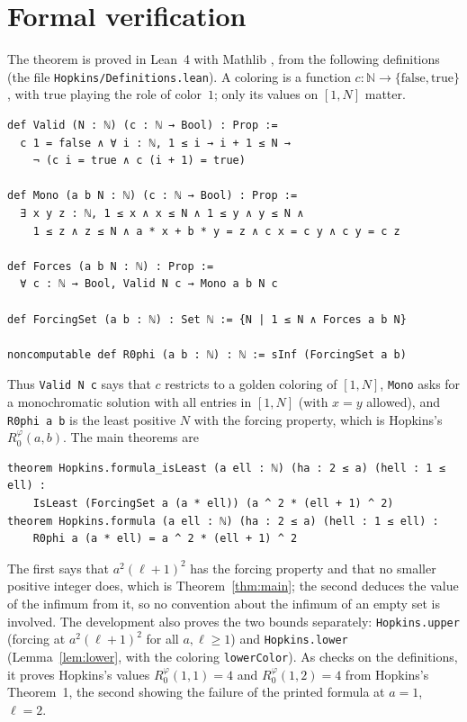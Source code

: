 \documentclass[11pt]{article}
\theoremstyle{remark}
\newcommand{\Rg}{R_0^{\varphi}}
\begin{document}
\section{Formal verification}
The theorem is proved in Lean~4 \cite{Lean} with Mathlib
\cite{Mathlib}, from the following definitions (the file
\texttt{Hopkins/Definitions.lean}). A coloring is a function
$c:\mathbb N\to\{\mathrm{false},\mathrm{true}\}$, with
$\mathrm{true}$ playing the role of color~$1$; only its values on
$[1,N]$ matter.
\begin{Verbatim}
def Valid (N : ℕ) (c : ℕ → Bool) : Prop :=
  c 1 = false ∧ ∀ i : ℕ, 1 ≤ i → i + 1 ≤ N →
    ¬ (c i = true ∧ c (i + 1) = true)

def Mono (a b N : ℕ) (c : ℕ → Bool) : Prop :=
  ∃ x y z : ℕ, 1 ≤ x ∧ x ≤ N ∧ 1 ≤ y ∧ y ≤ N ∧
    1 ≤ z ∧ z ≤ N ∧ a * x + b * y = z ∧ c x = c y ∧ c y = c z

def Forces (a b N : ℕ) : Prop :=
  ∀ c : ℕ → Bool, Valid N c → Mono a b N c

def ForcingSet (a b : ℕ) : Set ℕ := {N | 1 ≤ N ∧ Forces a b N}

noncomputable def R0phi (a b : ℕ) : ℕ := sInf (ForcingSet a b)
\end{Verbatim}
Thus \texttt{Valid N c} says that $c$ restricts to a golden coloring of
$[1,N]$, \texttt{Mono} asks for a monochromatic solution with all
entries in $[1,N]$ (with $x=y$ allowed), and \texttt{R0phi a b} is the
least positive $N$ with the forcing property, which is Hopkins's
$\Rg(a,b)$. The main theorems are
\begin{Verbatim}
theorem Hopkins.formula_isLeast (a ell : ℕ) (ha : 2 ≤ a) (hell : 1 ≤ ell) :
    IsLeast (ForcingSet a (a * ell)) (a ^ 2 * (ell + 1) ^ 2)
theorem Hopkins.formula (a ell : ℕ) (ha : 2 ≤ a) (hell : 1 ≤ ell) :
    R0phi a (a * ell) = a ^ 2 * (ell + 1) ^ 2
\end{Verbatim}
The first says that $a^2(\ell+1)^2$ has the forcing property and that no
smaller positive integer does, which is Theorem~\ref{thm:main}; the
second deduces the value of the infimum from it, so no convention about
the infimum of an empty set is involved. The development also proves
the two bounds separately: \texttt{Hopkins.upper} (forcing at
$a^2(\ell+1)^2$ for all $a,\ell\ge1$) and \texttt{Hopkins.lower}
(Lemma~\ref{lem:lower}, with the coloring \texttt{lowerColor}). As
checks on the definitions, it proves Hopkins's values $\Rg(1,1)=4$ and
$\Rg(1,2)=4$ from Hopkins's Theorem~1, the second showing the failure of the
printed formula at $a=1$, $\ell=2$.
\end{document}
